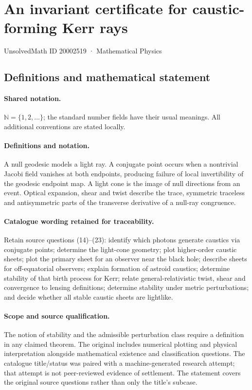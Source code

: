 \documentclass[11pt]{article}
\begin{document}
\setcounter{section}{20002518}
\section{An invariant certificate for caustic-forming Kerr rays}\label{20002519}
{\small UnsolvedMath ID 20002519 · Mathematical Physics}
\subsection{Definitions and mathematical statement}

\paragraph{Shared notation.}$\mathbb N=\{1,2,\ldots\}$; the standard number fields have their usual meanings. All additional conventions are stated locally.


\paragraph{Definitions and notation.}A null geodesic models a light ray. A conjugate point occurs when a nontrivial Jacobi field vanishes at both endpoints, producing failure of local invertibility of the geodesic endpoint map. A light cone is the image of null directions from an event. Optical expansion, shear and twist describe the trace, symmetric traceless and antisymmetric parts of the transverse derivative of a null-ray congruence.

\paragraph{Catalogue wording retained for traceability.}
Retain source questions (14)--(23): identify which photons generate caustics via conjugate points; determine the light-cone geometry; plot higher-order caustic sheets; plot the primary sheet for an observer near the black hole; describe sheets for off-equatorial observers; explain formation of astroid caustics; determine stability of that birth process for Kerr; relate general-relativistic twist, shear and convergence to lensing definitions; determine stability under metric perturbations; and decide whether all stable caustic sheets are lightlike.
\paragraph{Scope and source qualification.}The notion of stability and the admissible perturbation class require a definition in any claimed theorem. The original includes numerical plotting and physical interpretation alongside mathematical existence and classification questions. The catalogue title/status was paired with a machine-generated research attempt; that attempt is not peer-reviewed evidence of settlement. The statement covers the original source questions rather than only the title’s subcase.
\end{document}
